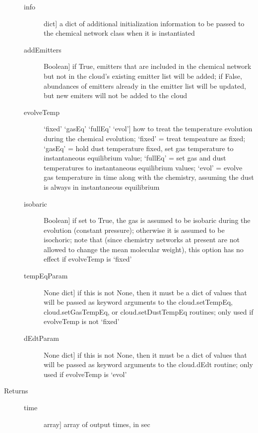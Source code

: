 \documentclass[letterpaper,10pt,english]{sphinxmanual}
\begin{document}
\begin{fulllineitems}
\begin{description}
\begin{description}
\item[{info}] \leavevmode{[}dict{]}
a dict of additional initialization information to be passed
to the chemical network class when it is instantiated

\item[{addEmitters}] \leavevmode{[}Boolean{]}
if True, emitters that are included in the chemical
network but not in the cloud's existing emitter list will
be added; if False, abundances of emitters already in the
emitter list will be updated, but new emiters will not be
added to the cloud

\item[{evolveTemp}] \leavevmode{[}`fixed' \textbar{} `gasEq' \textbar{} `fullEq' \textbar{} `evol'{]}
how to treat the temperature evolution during the chemical
evolution; `fixed' = treat tempeature as fixed; `gasEq' = hold
dust temperature fixed, set gas temperature to instantaneous
equilibrium value; `fullEq' = set gas and dust temperatures to
instantaneous equilibrium values; `evol' = evolve gas
temperature in time along with the chemistry, assuming the
dust is always in instantaneous equilibrium

\item[{isobaric}] \leavevmode{[}Boolean{]}
if set to True, the gas is assumed to be isobaric during the
evolution (constant pressure); otherwise it is assumed to be
isochoric; note that (since chemistry networks at present are
not allowed to change the mean molecular weight), this option
has no effect if evolveTemp is `fixed'

\item[{tempEqParam}] \leavevmode{[}None \textbar{} dict{]}
if this is not None, then it must be a dict of values that
will be passed as keyword arguments to the cloud.setTempEq,
cloud.setGasTempEq, or cloud.setDustTempEq routines; only used
if evolveTemp is not `fixed'

\item[{dEdtParam}] \leavevmode{[}None \textbar{} dict{]}
if this is not None, then it must be a dict of values that
will be passed as keyword arguments to the cloud.dEdt
routine; only used if evolveTemp is `evol'

\end{description}

\item[{Returns}] \leavevmode\begin{description}
\item[{time}] \leavevmode{[}array{]}
array of output times, in sec


\end{description}
\end{description}
\end{fulllineitems}
\end{document}
